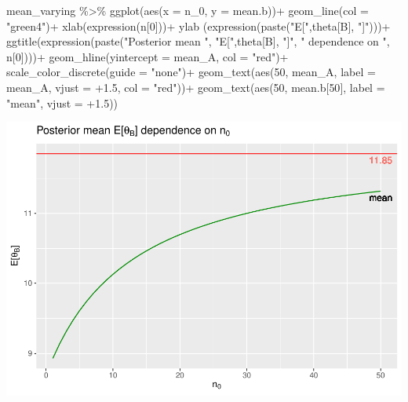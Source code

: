 \documentclass[
  11pt,
]{article}
\newenvironment{Shaded}{\begin{snugshade}}{\end{snugshade}}
\newcommand{\AttributeTok}[1]{\textcolor[rgb]{0.77,0.63,0.00}{#1}}
\newcommand{\DecValTok}[1]{\textcolor[rgb]{0.00,0.00,0.81}{#1}}
\newcommand{\FloatTok}[1]{\textcolor[rgb]{0.00,0.00,0.81}{#1}}
\newcommand{\FunctionTok}[1]{\textcolor[rgb]{0.00,0.00,0.00}{#1}}
\newcommand{\NormalTok}[1]{#1}
\newcommand{\SpecialCharTok}[1]{\textcolor[rgb]{0.00,0.00,0.00}{#1}}
\newcommand{\StringTok}[1]{\textcolor[rgb]{0.31,0.60,0.02}{#1}}
\begin{document}
\begin{Shaded}
\begin{Highlighting}[]
\NormalTok{mean\_varying }\SpecialCharTok{\%\textgreater{}\%} \FunctionTok{ggplot}\NormalTok{(}\FunctionTok{aes}\NormalTok{(}\AttributeTok{x =}\NormalTok{ n\_0, }\AttributeTok{y =}\NormalTok{ mean.b))}\SpecialCharTok{+}
  \FunctionTok{geom\_line}\NormalTok{(}\AttributeTok{col =} \StringTok{"green4"}\NormalTok{)}\SpecialCharTok{+}
  \FunctionTok{xlab}\NormalTok{(}\FunctionTok{expression}\NormalTok{(n[}\DecValTok{0}\NormalTok{]))}\SpecialCharTok{+}
  \FunctionTok{ylab}\NormalTok{ (}\FunctionTok{expression}\NormalTok{(}\FunctionTok{paste}\NormalTok{(}\StringTok{"E["}\NormalTok{,theta[B], }\StringTok{"]"}\NormalTok{)))}\SpecialCharTok{+}
  \FunctionTok{ggtitle}\NormalTok{(}\FunctionTok{expression}\NormalTok{(}\FunctionTok{paste}\NormalTok{(}\StringTok{"Posterior mean "}\NormalTok{, }\StringTok{"E["}\NormalTok{,theta[B], }\StringTok{"]"}\NormalTok{, }\StringTok{" dependence on "}\NormalTok{, n[}\DecValTok{0}\NormalTok{])))}\SpecialCharTok{+}
  \FunctionTok{geom\_hline}\NormalTok{(}\AttributeTok{yintercept =}\NormalTok{ mean\_A, }\AttributeTok{col =} \StringTok{"red"}\NormalTok{)}\SpecialCharTok{+}
  \FunctionTok{scale\_color\_discrete}\NormalTok{(}\AttributeTok{guide =} \StringTok{"none"}\NormalTok{)}\SpecialCharTok{+}
  \FunctionTok{geom\_text}\NormalTok{(}\FunctionTok{aes}\NormalTok{(}\DecValTok{50}\NormalTok{, mean\_A, }\AttributeTok{label =}\NormalTok{ mean\_A, }\AttributeTok{vjust =} \SpecialCharTok{+}\FloatTok{1.5}\NormalTok{, }\AttributeTok{col =} \StringTok{"red"}\NormalTok{))}\SpecialCharTok{+}
  \FunctionTok{geom\_text}\NormalTok{(}\FunctionTok{aes}\NormalTok{(}\DecValTok{50}\NormalTok{, mean.b[}\DecValTok{50}\NormalTok{], }\AttributeTok{label =} \StringTok{"mean"}\NormalTok{, }\AttributeTok{vjust =} \SpecialCharTok{+}\FloatTok{1.5}\NormalTok{))}
\end{Highlighting}
\end{Shaded}

\begin{center}\includegraphics[width=0.6\linewidth]{1_hw_bs_code_files/figure-latex/unnamed-chunk-3-1} \end{center}
\normalsize
\end{document}
